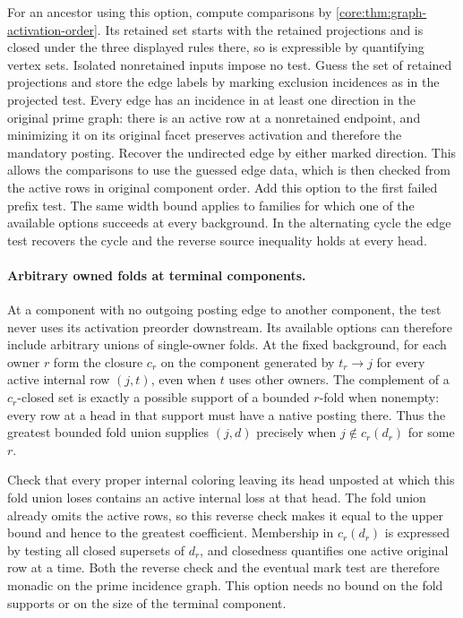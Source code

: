 For an ancestor using this option, compute comparisons
by \cref{core:thm:graph-activation-order}. Its retained
set starts with the retained projections and is closed
under the three displayed rules there, so is expressible
by quantifying vertex sets. Isolated nonretained inputs
impose no test. Guess the set of retained projections
and store the edge labels by marking exclusion incidences
as in the projected test. Every edge has an incidence in
at least one direction in the original prime graph:
there is an active row at a nonretained endpoint,
and minimizing it on its original facet preserves
activation and therefore the mandatory posting. Recover
the undirected edge by either marked direction. This allows the
comparisons to use the guessed edge data, which is then
checked from the active rows in original component
order. Add this option to the first failed prefix test.
The same width bound applies to families for which one
of the available options succeeds at every background.
In the alternating cycle the edge test recovers the
cycle and the reverse source inequality holds at
every head.

\paragraph{Arbitrary owned folds at terminal components.}
At a component with no outgoing posting edge to another
component, the test never uses its activation preorder
downstream. Its available options can therefore include
arbitrary unions of single-owner folds. At the fixed
background, for each owner $r$ form the closure $c_r$ on
the component generated by $t_r\to j$ for every active
internal row $(j,t)$, even when $t$ uses other owners.
The complement of a $c_r$-closed set is exactly a
possible support of a bounded $r$-fold when nonempty:
every row at a head in that support must have a native
posting there. Thus the greatest bounded fold union
supplies $(j,d)$ precisely when $j\notin c_r(d_r)$ for
some $r$.

Check that every proper internal coloring leaving its
head unposted at which this fold union loses contains
an active internal loss at that head. The fold union
already omits the active rows, so this reverse check
makes it equal to the upper bound and hence to the
greatest coefficient. Membership in $c_r(d_r)$ is
expressed by testing all closed supersets of $d_r$,
and closedness quantifies one active original row at
a time. Both the reverse check and the eventual mark
test are therefore monadic on the prime incidence graph.
This option needs no bound on the fold supports or
on the size of the terminal component.

